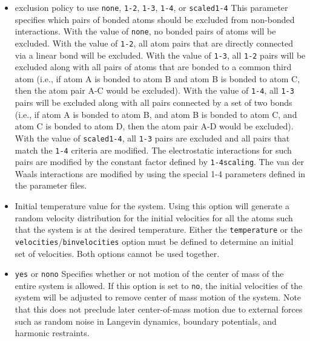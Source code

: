 \begin{itemize}
\item
{}%
{exclusion policy to use}%
{\verb!none!, \verb!1-2!, \verb!1-3!, \verb!1-4!, or \verb!scaled1-4!}%
{\label{param:exclude}
This parameter specifies which pairs of bonded atoms should
be excluded from non-bonded
interactions.  With the value of \verb!none!, no bonded pairs of atoms 
will be excluded.  With the value of \verb!1-2!, all atom pairs that
are directly connected via a linear bond will be excluded.  With the
value of \verb!1-3!, all \verb!1-2! pairs will be excluded along with
all pairs of atoms that are bonded to a common
third atom (i.e., if atom A is bonded to atom B and atom B is bonded
to atom C, then the atom pair A-C would be excluded).
With the value of \verb!1-4!, all \verb!1-3! pairs will be excluded along
with all pairs connected by a set of two bonds (i.e., if atom A is bonded
to atom B, and atom B is bonded to atom C, and atom C is bonded to
atom D, then the atom pair A-D would be excluded).  With the value
of \verb!scaled1-4!, all \verb!1-3! pairs are excluded and all pairs
that match the \verb!1-4! criteria are modified.  The electrostatic
interactions for such pairs are modified by the constant factor
defined by \verb!1-4scaling!.  
The van der Waals interactions are modified
by using the special 1-4 parameters defined in the parameter files.}

\item
{}
{\label{param:temperature}
Initial temperature value for the system.  
Using this option will generate a random
velocity distribution for the initial velocities 
for all the atoms such that the system 
is at the desired temperature.  
Either the \verb!temperature! 
or the \verb!velocities!/\verb!binvelocities!
option must be defined to determine an initial set of velocities.  
Both options cannot be used together.}

\item
{}%
{\verb!yes! or \verb!no!}{\verb!no!}
{
Specifies whether or not motion of 
the center of mass of the entire system is allowed.  
If this option is set to \verb!no!, the initial velocities of the system 
will be adjusted to remove center of mass motion of the system.
Note that this does not preclude later center-of-mass motion due to 
external forces such as random noise in Langevin dynamics, boundary
potentials, and harmonic restraints.}


\end{itemize}
